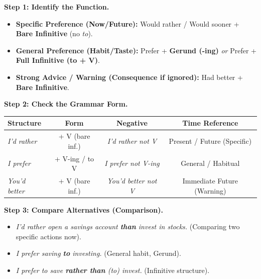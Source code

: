 \documentclass[11pt]{article}
\newcommand{\cle}[1]{{\popxbold\color{popdark}#1}}
\begin{document}
\begin{methode}
\textbf{Step 1: Identify the Function.}
\begin{itemize}
    \item \textbf{Specific Preference (Now/Future):} \cle{Would rather / Would sooner} + \textbf{Bare Infinitive} (no \textit{to}).
    \item \textbf{General Preference (Habit/Taste):} \cle{Prefer} + \textbf{Gerund (-ing)} \textit{or} \cle{Prefer} + \textbf{Full Infinitive (to + V)}.
    \item \textbf{Strong Advice / Warning (Consequence if ignored):} \cle{Had better} + \textbf{Bare Infinitive}.
\end{itemize}

\textbf{Step 2: Check the Grammar Form.}
\begin{center}
\begin{tabular}{|l|c|c|c|}\hline
\rowcolor{popblueL}
\textbf{Structure} & \textbf{Form} & \textbf{Negative} & \textbf{Time Reference} \\ \hline
\textit{I'd rather} & + V (bare inf.) & \textit{I'd rather not V} & Present / Future (Specific) \\ \hline
\textit{I prefer} & + V-ing / to V & \textit{I prefer not V-ing} & General / Habitual \\ \hline
\textit{You'd better} & + V (bare inf.) & \textit{You'd better not V} & Immediate Future (Warning) \\ \hline
\end{tabular}
\end{center}

\textbf{Step 3: Compare Alternatives (Comparison).}
\begin{itemize}
    \item \textit{I'd rather open a savings account \textbf{than} invest in stocks.} (Comparing two specific actions now).
    \item \textit{I prefer saving \textbf{to} investing.} (General habit, Gerund).
    \item \textit{I prefer to save \textbf{rather than} (to) invest.} (Infinitive structure).
\end{itemize}
\end{methode}
\end{document}
